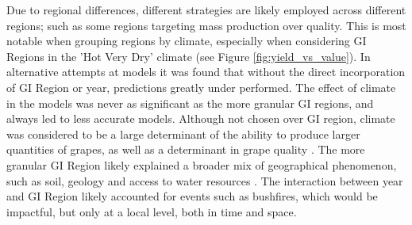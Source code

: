 \documentclass[review,12pt,authoryear]{elsarticle}
\begin{document}
\begin{linenumbers}
Due to regional differences, different strategies are likely employed across different regions; such as some regions targeting mass production over quality. This is most notable when grouping regions by climate, especially when considering GI Regions in the 'Hot Very Dry' climate (see Figure \ref{fig:yield_vs_value}). In alternative attempts at models it was found that without the direct incorporation of GI Region or year, predictions greatly under performed. The effect of climate in the models was never as significant as the more granular GI regions, and always led to less accurate models. Although not chosen over GI region, climate was considered to be a large determinant of the ability to produce larger quantities of grapes, as well as a determinant in grape quality \citep{agostaRegionalClimateVariability2012}. The more granular GI Region likely explained a broader mix of geographical phenomenon, such as soil, geology and access to water resources \citep{abbalDecisionSupportSystem2016,carmonaUseParticipatoryObjectOriented2011}. The interaction between year and GI Region likely accounted for events such as bushfires, which would be impactful, but only at a local level, both in time and space.


\end{linenumbers}
\end{document}
